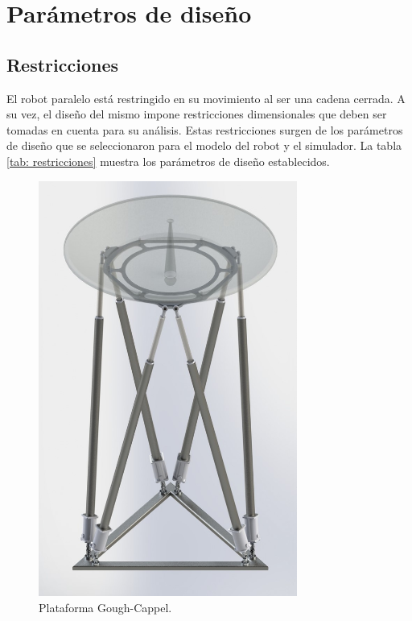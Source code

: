 \section{Parámetros de diseño}

\subsection{Restricciones}
El robot paralelo está restringido en su movimiento 
al ser una cadena cerrada.
A su vez, el diseño del mismo impone restricciones dimensionales 
que deben ser tomadas en cuenta para su análisis.
Estas restricciones surgen de los parámetros de diseño que 
se seleccionaron para el modelo del robot y el simulador.
La tabla \ref{tab: restricciones} muestra los 
parámetros de diseño establecidos.

\begin{figure}
 \centering
 \includegraphics[width=8.5cm]{03_Reporte/img/PGScrop.jpg}
 \caption{Plataforma Gough-Cappel.}
 \label{fig: cad}
\end{figure}



